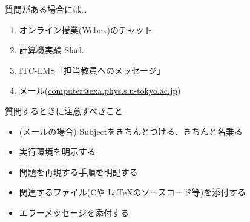 \begin{frame}[t]{質問がある場合には…}
  \begin{enumerate}
  \item オンライン授業(Webex)のチャット
  \item 計算機実験 Slack
  \item ITC-LMS「担当教員へのメッセージ」
  \item メール(\href{mailto:computer@exa.phys.s.u-tokyo.ac.jp}{computer@exa.phys.s.u-tokyo.ac.jp})
  \end{enumerate}
  質問するときに注意すべきこと
  \begin{itemize}
  \item (メールの場合) Subjectをきちんとつける、きちんと名乗る
  \item 実行環境を明示する
  \item 問題を再現する手順を明記する
  \item 関連するファイル(Cや \LaTeX のソースコード等)を添付する
  \item エラーメッセージを添付する
  \end{itemize}
\end{frame}

